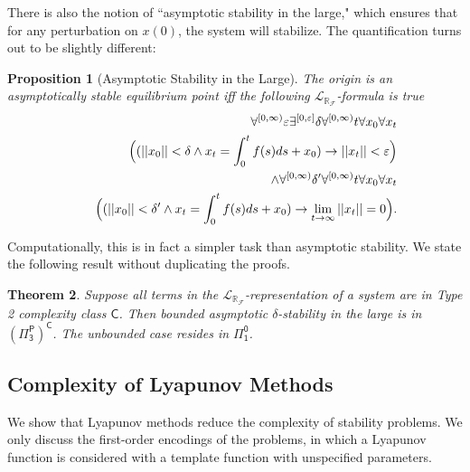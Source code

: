 \documentclass[10pt]{article}
\theoremstyle{plain}
\newtheorem{theorem}{Theorem}[section]
\newtheorem{proposition}[theorem]{Proposition}
\theoremstyle{definition}
\newcommand{\lrf}{\mathcal{L}_{\mathbb{R}_{\mathcal{F}}}}
\begin{document}
There is also the notion of ``asymptotic stability in the large," which ensures that for any perturbation on $x(0)$, the system will stabilize. The quantification turns out to be slightly different:
\begin{proposition}[Asymptotic Stability in the Large]
The origin is an asymptotically stable equilibrium point iff the following $\lrf$-formula is true
\begin{eqnarray*}
& &\forall^{[0,\infty)} \varepsilon\exists^{[0,\varepsilon]} \delta\forall^{[0,\infty)} t\forall x_0\forall x_t\\
& &\hspace{.5cm}\Big((||x_0||<\delta \wedge x_t = \int_0^t f(s)ds + x_0 )\rightarrow ||x_t||<\varepsilon\Big)\\
& &\wedge \forall^{[0,\infty)} \delta'  \forall^{[0,\infty)} t\forall x_0\forall x_t\\
& & \hspace{.3cm}\Big( (||x_0||<\delta'\wedge x_t = \int_0^t f(s)ds + x_0 )\rightarrow \lim_{t\rightarrow \infty} ||x_t|| = 0\Big). 
\end{eqnarray*}
\end{proposition}
Computationally, this is in fact a simpler task than asymptotic stability. We state the following result without duplicating the proofs. 
\begin{theorem}
Suppose all terms in the $\lrf$-representation of a system are in Type 2 complexity class $\mathsf{C}$. Then bounded asymptotic $\delta$-stability in the large is in $\mathsf{(\Pi^P_3)^C}$. The unbounded case resides in $\mathsf{\Pi^0_1}$.  
\end{theorem}


\subsection{Complexity of Lyapunov Methods}

We show that Lyapunov methods reduce the complexity of stability problems. We only discuss the first-order encodings of the problems, in which a Lyapunov function is considered with a template function with unspecified parameters. 
\end{document}
